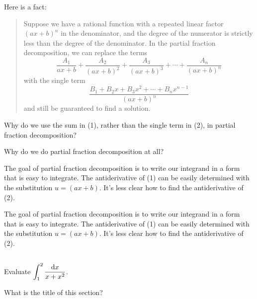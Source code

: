 \begin{question}
Here is a fact:
\begin{quote}
 \color{blue}
Suppose we have a rational function with a repeated linear factor $(ax+b)^n$ in the denominator, and the degree of the numerator is strictly less than the degree of the denominator. In the partial fraction decomposition, we can replace the terms
\begin{equation}\frac{A_1}{ax+b} + \frac{A_2}{(ax+b)^2}+\frac{A_3}{(ax+b)^3}+\cdots+
\frac{A_n}{(ax+b)^n}\tag{1}\end{equation}
with the single term
\begin{equation}\frac{B_1+B_2x+B_3x^2+\cdots + B_{n}x^{n-1}}{(ax+b)^n}\tag{2}\end{equation}
and still be guaranteed to find a solution.\color{black}\end{quote}

Why do we use the sum in (1), rather than the single term in (2), in partial fraction decomposition?
\end{question}
\begin{hint}
Why do we do partial fraction decomposition at all?
\end{hint}
\begin{answer}
The goal of partial fraction decomposition is to write our integrand in a form that is easy to integrate. The antiderivative of (1) can be easily determined with the substitution $u=(ax+b)$. It's less clear how to find the antiderivative of (2).
\end{answer}
\begin{solution}
The goal of partial fraction decomposition is to write our integrand in a form that is easy to integrate. The antiderivative of (1) can be easily determined with the substitution $u=(ax+b)$. It's less clear how to find the antiderivative of (2).
\end{solution}




\subsection*{\Procedural}

\begin{question}[2013A]\label{prob_s1.10:x+x^2}
Evaluate $\displaystyle\int_1^2 \frac{\mathrm{d}x}{x+x^2}$.
\end{question}

\begin{hint}
What is the title of this section?
\end{hint}


